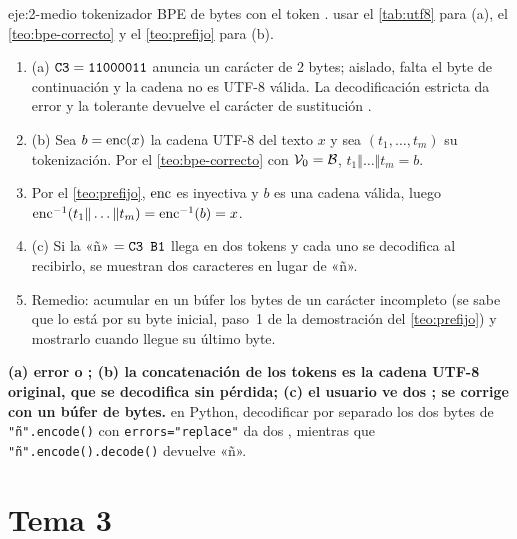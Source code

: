 \begin{solucion}{eje:2-medio}
\datos tokenizador BPE de bytes con el token .
\planteamiento usar el \cref{tab:utf8} para (a), el \cref{teo:bpe-correcto} y el \cref{teo:prefijo} para (b).
\pasos
\begin{enumerate}[label=\arabic*.]
  \item (a) $\texttt{C3}=\texttt{11000011}$ anuncia un carácter de 2 bytes; aislado, falta el byte de continuación y la cadena no es UTF-8 válida. La decodificación estricta da error y la tolerante devuelve el carácter de sustitución .
  \item (b) Sea $b=\operatorname{enc}(x)$ la cadena UTF-8 del texto $x$ y sea $(t_1,\dots,t_m)$ su tokenización. Por el \cref{teo:bpe-correcto} con $\mathcal{V}_0=\mathcal{B}$, $t_1\Vert\dots\Vert t_m=b$.
  \item Por el \cref{teo:prefijo}, $\operatorname{enc}$ es inyectiva y $b$ es una cadena válida, luego $\operatorname{enc}^{-1}(t_1\Vert\dots\Vert t_m)=\operatorname{enc}^{-1}(b)=x$.
  \item (c) Si la «ñ» $=\texttt{C3 B1}$ llega en dos tokens y cada uno se decodifica al recibirlo, se muestran dos caracteres  en lugar de «ñ».
  \item Remedio: acumular en un búfer los bytes de un carácter incompleto (se sabe que lo está por su byte inicial, paso~1 de la demostración del \cref{teo:prefijo}) y mostrarlo cuando llegue su último byte.
\end{enumerate}
\resultado \textbf{(a) error o ; (b) la concatenación de los tokens es la cadena UTF-8 original, que se decodifica sin pérdida; (c) el usuario ve dos ; se corrige con un búfer de bytes.}
\comprobacion en Python, decodificar por separado los dos bytes de \texttt{"ñ".encode()} con \texttt{errors="replace"} da dos , mientras que \texttt{"ñ".encode().decode()} devuelve «ñ».
\end{solucion}

\section{Tema 3}

